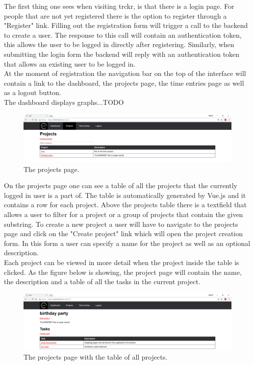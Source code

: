 \documentclass[a4paper, 12pt, headsepline]{scrartcl}
\begin{document}
The first thing one sees when visiting trckr, is that there is a login page.
For people that are not yet registered there is the option to register through a
"Register" link. Filling out the registration form will trigger a call to the
backend to create a user. The response to this call will contain an authentication
token, this allows the user to be logged in directly after registering.
Similarly, when submitting the login form the backend will reply with an
authentication token that allows an existing user to be logged in.\\
At the moment of registration the navigation bar on the top of the interface
will contain a link to the dashboard, the projects page, the time entries page
as well as a logout button.\\
The dashboard displays graphs...TODO \\

\begin{figure}[h]
    \includegraphics[width=\textwidth]{trckr-projects-table}
    \caption{The projects page.}
    \label{fig:trckr-projects-table}
\end{figure}

On the projects page one can see a table of all the projects that the currently
logged in user is a part of. The table is automatically generated by Vue.js and
it contains a row for each project. Above the projects table there is a
textfield that allows a user to filter for a project or a group of projects that
contain the given substring. To create a new project a user will have to
navigate to the projects page and click on the "Create project" link which will
open the project creation form. In this form a user can specify a name for the
project as well as an optional description.\\
Each project can be viewed in more detail when the project inside the table is
clicked. As the figure below is showing, the project page will contain the name,
the description and a table of all the tasks in the current project.

\begin{figure}[h]
    \includegraphics[width=\textwidth]{trckr-project-page}
    \caption{The projects page with the table of all projects.}
    \label{fig:trckr-project-page}
\end{figure}
\end{document}
